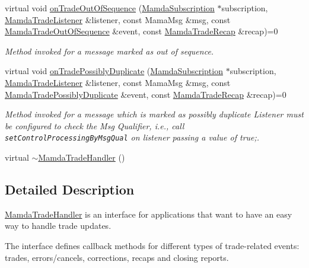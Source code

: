 \begin{CompactItemize}
virtual void \hyperlink{classWombat_1_1MamdaTradeHandler_473839f9695a2ae3d41308ac8a223a14}{on\-Trade\-Out\-Of\-Sequence} (\hyperlink{classWombat_1_1MamdaSubscription}{Mamda\-Subscription} $\ast$subscription, \hyperlink{classWombat_1_1MamdaTradeListener}{Mamda\-Trade\-Listener} \&listener, const Mama\-Msg \&msg, const \hyperlink{classWombat_1_1MamdaTradeOutOfSequence}{Mamda\-Trade\-Out\-Of\-Sequence} \&event, const \hyperlink{classWombat_1_1MamdaTradeRecap}{Mamda\-Trade\-Recap} \&recap)=0
\begin{CompactList}\small\item\em Method invoked for a message marked as out of sequence. \item\end{CompactList}\item 
virtual void \hyperlink{classWombat_1_1MamdaTradeHandler_7ee70ea10323bc436c6445b0de502b34}{on\-Trade\-Possibly\-Duplicate} (\hyperlink{classWombat_1_1MamdaSubscription}{Mamda\-Subscription} $\ast$subscription, \hyperlink{classWombat_1_1MamdaTradeListener}{Mamda\-Trade\-Listener} \&listener, const Mama\-Msg \&msg, const \hyperlink{classWombat_1_1MamdaTradePossiblyDuplicate}{Mamda\-Trade\-Possibly\-Duplicate} \&event, const \hyperlink{classWombat_1_1MamdaTradeRecap}{Mamda\-Trade\-Recap} \&recap)=0
\begin{CompactList}\small\item\em Method invoked for a message which is marked as possibly duplicate Listener must be configured to check the Msg Qualifier, i.e., call {\tt set\-Control\-Processing\-By\-Msg\-Qual} on listener passing a value of true;. \item\end{CompactList}\item 
virtual \hyperlink{classWombat_1_1MamdaTradeHandler_d4baa77255511ab84e6dc3152ea3682f}{$\sim$Mamda\-Trade\-Handler} ()
\end{CompactItemize}


\subsection{Detailed Description}
\hyperlink{classWombat_1_1MamdaTradeHandler}{Mamda\-Trade\-Handler} is an interface for applications that want to have an easy way to handle trade updates. 

The interface defines callback methods for different types of trade-related events: trades, errors/cancels, corrections, recaps and closing reports. 



